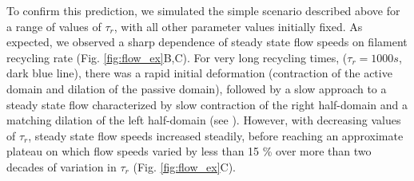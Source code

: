 To confirm this prediction, we simulated the simple scenario described above for a range of values of $\tau_r$, with all other parameter values initially fixed. As expected, we observed a sharp dependence of steady state flow speeds on filament recycling rate (Fig. \ref{fig:flow_ex}B,C). For very long recycling times, ($\tau_r=1000 s$, dark blue line), there was a rapid initial deformation (contraction of the active domain and dilation of the passive domain), followed by a slow approach to a steady state flow characterized by slow contraction of the right half-domain and a matching dilation of the left half-domain (see ).  However, with decreasing values of $\tau_r$, steady state flow speeds increased steadily, before reaching an approximate plateau on which flow speeds varied by less than 15 \% over more than two decades of variation in $\tau_r$ (Fig. \ref{fig:flow_ex}C).  

